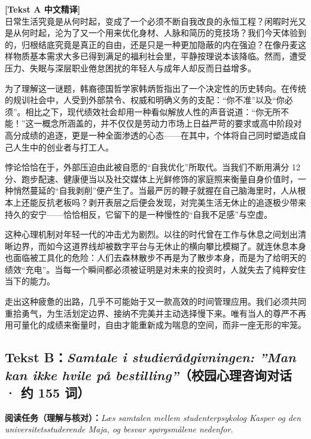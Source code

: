 \begin{transbox}
\small
\textbf{\color{NCDTeal}[Tekst A 中文精译]}\\
日常生活究竟是从何时起，变成了一个必须不断自我改良的永恒工程？闲暇时光又是从何时起，沦为了又一个用来优化身材、人脉和简历的竞技场？我们今天体验到的，归根结底究竟是真正的自由，还是只是一种更加隐蔽的内在强迫？在像丹麦这样物质基本需求大多已得到满足的福利社会里，平静按理说本该降临。然而，遭受压力、失眠与深层职业倦怠困扰的年轻人与成年人却反而日益增多。

为了理解这一谜题，韩裔德国哲学家韩炳哲指出了一个决定性的历史转向。在传统的规训社会中，人受到外部禁令、权威和明确义务的支配：“你不准”以及“你必须”。相比之下，现代绩效社会却用一种看似解放人性的声音说道：“你无所不能！”这一概念所涵盖的，并不仅仅是劳动力市场上日益严苛的要求或高中阶段对高分成绩的追逐，更是一种全面渗透的心态——在其中，个体将自己同时塑造成自己人生中的创业者与打工人。

悖论恰恰在于，外部压迫由此被自愿的“自我优化”所取代。当我们不断用满分 12 分、跑步配速、健康便当以及社交媒体上光鲜修饰的家庭照来衡量自身价值时，一种悄然蔓延的“自我剥削”便产生了。当最严厉的鞭子就握在自己脑海里时，人从根本上还能反抗老板吗？剥开表层之后便会发现，对完美生活无休止的追逐极少带来持久的安宁——恰恰相反，它留下的是一种慢性的“自我不足感”与空虚。

这种心理机制对年轻一代的冲击尤为剧烈。以往的时代曾在工作与休息之间划出清晰边界，而如今这道界线却被数字平台与无休止的横向攀比模糊了。就连休息本身也面临被工具化的危险：人们去森林散步不再是为了散步本身，而是为了给明天的绩效“充电”。当每一个瞬间都必须被证明是对未来的投资时，人就失去了纯粹安住当下的能力。

走出这种疲惫的出路，几乎不可能始于又一款高效的时间管理应用。我们必须共同重拾勇气，为生活划定边界、接纳不完美并主动选择慢下来。唯有当人的尊严不再用可量化的成绩来衡量时，自由才能重新成为喘息的空间，而非一座无形的牢笼。
\end{transbox}

\subsection*{Tekst B：\textit{Samtale i studierådgivningen: ”Man kan ikke hvile på bestilling”}（校园心理咨询对话 · 约 155 词）}

\textbf{阅读任务（理解与核对）：}\textit{Læs samtalen mellem studenterpsykolog Kasper og den universitetsstuderende Maja, og besvar spørgsmålene nedenfor.}

